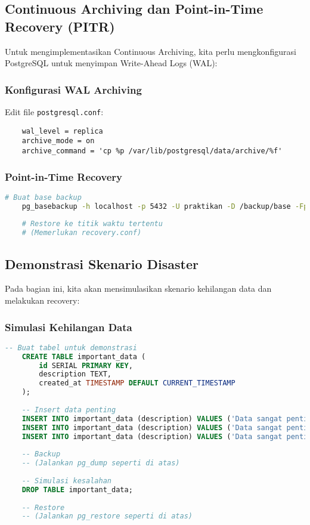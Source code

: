 \subsection{Continuous Archiving dan Point-in-Time Recovery (PITR)}
Untuk mengimplementasikan Continuous Archiving, kita perlu mengkonfigurasi PostgreSQL untuk menyimpan Write-Ahead Logs (WAL):

\subsubsection{Konfigurasi WAL Archiving}
Edit file \texttt{postgresql.conf}:

\begin{lstlisting}
	wal_level = replica
	archive_mode = on
	archive_command = 'cp %p /var/lib/postgresql/data/archive/%f'
\end{lstlisting}

\subsubsection{Point-in-Time Recovery}
\begin{lstlisting}[language=bash]
	# Buat base backup
	pg_basebackup -h localhost -p 5432 -U praktikan -D /backup/base -Fp -Xs -P
	
	# Restore ke titik waktu tertentu
	# (Memerlukan recovery.conf)
\end{lstlisting}

\subsection{Demonstrasi Skenario Disaster}
Pada bagian ini, kita akan mensimulasikan skenario kehilangan data dan melakukan recovery:

\subsubsection{Simulasi Kehilangan Data}
\begin{lstlisting}[language=SQL]
	-- Buat tabel untuk demonstrasi
	CREATE TABLE important_data (
		id SERIAL PRIMARY KEY,
		description TEXT,
		created_at TIMESTAMP DEFAULT CURRENT_TIMESTAMP
	);
	
	-- Insert data penting
	INSERT INTO important_data (description) VALUES ('Data sangat penting #1');
	INSERT INTO important_data (description) VALUES ('Data sangat penting #2');
	INSERT INTO important_data (description) VALUES ('Data sangat penting #3');
	
	-- Backup
	-- (Jalankan pg_dump seperti di atas)
	
	-- Simulasi kesalahan
	DROP TABLE important_data;
	
	-- Restore
	-- (Jalankan pg_restore seperti di atas)
\end{lstlisting}

